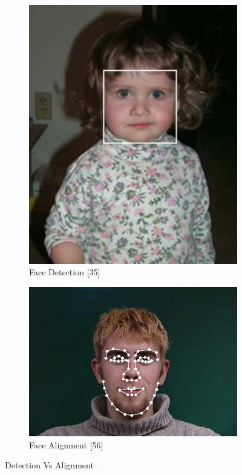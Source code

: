 \documentclass[12pt, twoside]{report}
\begin{document}
	\begin{figure}%
		\begin{subfigure}{0.5\textwidth}
		\centering
		\includegraphics[width=.6\linewidth, height=0.8\linewidth]{img/17_1.png}
		\caption[label a]{Face Detection [35]}
		\label{fig:test1}
		\end{subfigure}%
		\begin{subfigure}{0.5\textwidth}
		\centering
		\includegraphics[width=\linewidth, height=0.8\linewidth]{img/17_2.png}
		\caption[label b]{Face Alignment [56]}
		\label{fig:test2}
		\end{subfigure}
		\caption{Detection Vs Alignment}
		\end{figure}
		
\end{document}
